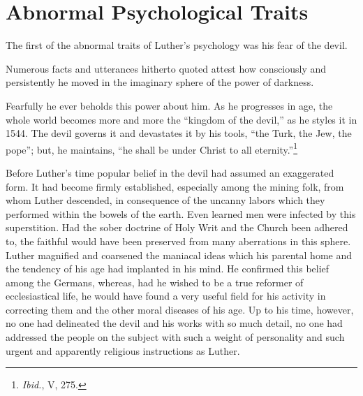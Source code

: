 \section{Abnormal Psychological Traits}

The first of the abnormal traits of Luther’s psychology was his fear
of the devil.

Numerous facts and utterances hitherto quoted attest how consciously and
persistently he moved in the imaginary sphere of the
power of darkness.

Fearfully he ever beholds this power about him. As he progresses
in age, the whole world becomes more and more the “kingdom of the
devil,” as he styles it in 1544. The devil governs it and devastates it by
his tools, “the Turk, the Jew, the pope”; but, he maintains, “he shall
be under Christ to all eternity.”\footnote{\textit{Ibid.}, V, 275.}

Before Luther’s time popular belief in the devil had assumed an exaggerated
form. It had become firmly established, especially among the
mining folk, from whom Luther descended, in consequence of the
uncanny labors which they performed within the bowels of the
earth. Even learned men were infected by this superstition. Had the
sober doctrine of Holy Writ and the Church been adhered to, the
faithful would have been preserved from many aberrations in this
sphere. Luther magnified and coarsened the maniacal ideas which his
parental home and the tendency of his age had implanted in his mind.
He confirmed this belief among the Germans, whereas, had he wished
to be a true reformer of ecclesiastical life, he would have found a
very useful field for his activity in correcting them and the other
moral diseases of his age. Up to his time, however, no one had delineated
the devil and his works with so much detail, no one had addressed
the people on the subject with such a weight of personality
and such urgent and apparently religious instructions as Luther.

